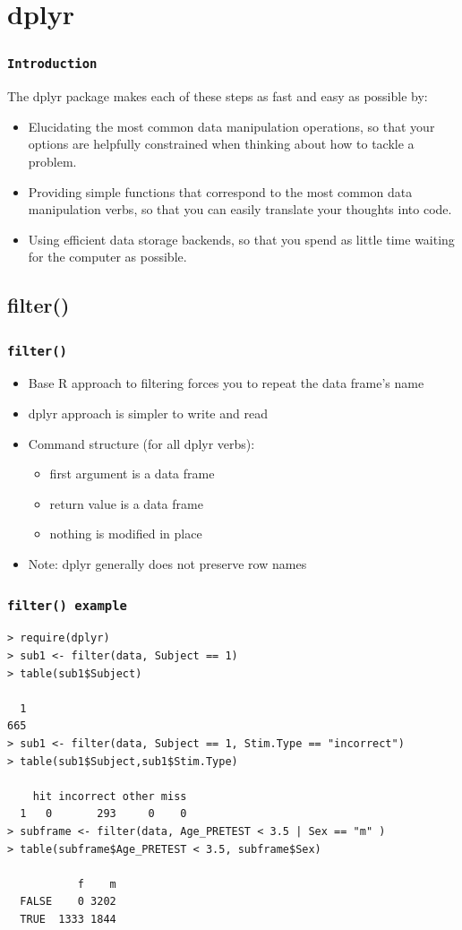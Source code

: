 \documentclass[xcolor={table},c]{beamer}
\begin{document}
\section{dplyr}
\begin{frame}\frametitle{\texttt{Introduction}}
The dplyr package makes each of these steps as fast and easy as possible by:
\begin{itemize}
\item  Elucidating the most common data manipulation operations, so that your options are helpfully constrained when thinking about how to tackle a problem.
\item  Providing simple functions that correspond to the most common data manipulation verbs, so that you can easily translate your thoughts into code.
\item Using efficient data storage backends, so that you spend as little time waiting for the computer as possible.
\end{itemize}
\end{frame}

\subsection{filter()}
\begin{frame}[fragile]\frametitle{\texttt{filter()}}
  \begin{itemize}
  \item  Base R approach to filtering forces you to repeat the data frame’s name
  \item dplyr approach is simpler to write and read
  \item Command structure (for all dplyr verbs):
    \begin{itemize}
    \item first argument is a data frame
    \item return value is a data frame
    \item nothing is modified in place
    \end{itemize}
  \item Note: dplyr generally does not preserve row names
  \end{itemize}
\end{frame}


\begin{frame}[fragile]\frametitle{\texttt{filter() example}}\footnotesize
\begin{verbatim}
> require(dplyr)
> sub1 <- filter(data, Subject == 1)
> table(sub1$Subject)

  1 
665   
> sub1 <- filter(data, Subject == 1, Stim.Type == "incorrect")
> table(sub1$Subject,sub1$Stim.Type)
   
    hit incorrect other miss
  1   0       293     0    0
> subframe <- filter(data, Age_PRETEST < 3.5 | Sex == "m" )
> table(subframe$Age_PRETEST < 3.5, subframe$Sex)
       
           f    m
  FALSE    0 3202
  TRUE  1333 1844
\end{verbatim}
\end{frame}
\end{document}
